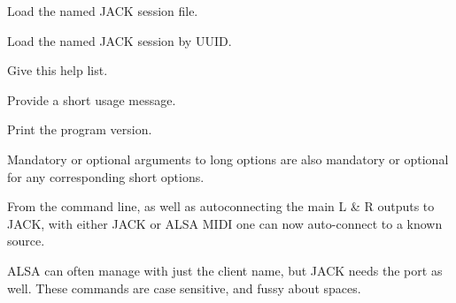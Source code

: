       Load the named JACK session file.

      Load the named JACK session by UUID.

      Give this help list.

      Provide a short usage message.

      Print the program version.

   Mandatory or optional arguments to long options are also mandatory or
   optional for any corresponding short options.

   From the command line, as well as autoconnecting the main L \& R outputs
   to JACK, with either JACK or ALSA MIDI one can now auto-connect to a
   known source.

   ALSA can often manage with just the client name, but JACK needs the port
   as well. These commands are case sensitive, and fussy about spaces.


